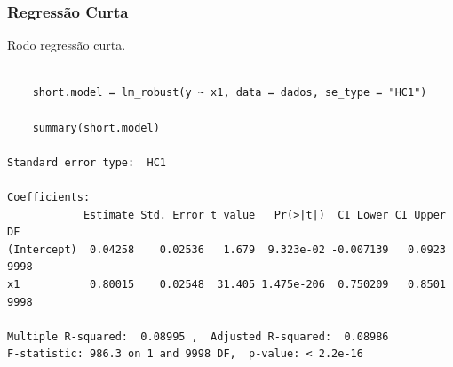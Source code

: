 \documentclass[10pt,slides,xcolor=pdftex,dvipsnames,table]{beamer}
\begin{document}

\begin{frame}[fragile]
	\frametitle{Regressão Curta}

\vspace{0.5cm}
Rodo regressão curta.

\begin{lstlisting}

	short.model = lm_robust(y ~ x1, data = dados, se_type = "HC1")

	summary(short.model)

Standard error type:  HC1 

Coefficients:
            Estimate Std. Error t value   Pr(>|t|)  CI Lower CI Upper   DF
(Intercept)  0.04258    0.02536   1.679  9.323e-02 -0.007139   0.0923 9998
x1           0.80015    0.02548  31.405 1.475e-206  0.750209   0.8501 9998

Multiple R-squared:  0.08995 ,	Adjusted R-squared:  0.08986 
F-statistic: 986.3 on 1 and 9998 DF,  p-value: < 2.2e-16

\end{lstlisting}

\end{frame}

\end{document}
